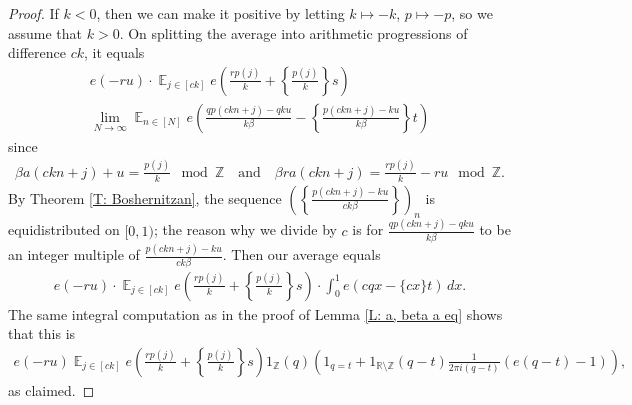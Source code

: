 \documentclass[11pt]{amsart}
\theoremstyle{definition}
\DeclareMathOperator*{\E}{\mathbb{E}}
\newcommand{\N}{{\mathbb N}}
\newcommand{\R}{{\mathbb R}}
\newcommand{\T}{{\mathbb T}}
\newcommand{\Z}{{\mathbb Z}}
\newcommand{\1}{{\mathbf{1}}}
\newcommand{\brac}[1]{\mathopen{}\left( #1 \mathclose{}\right)}
\newcommand{\rem}[1]{\left \{ #1 \right \}}
\begin{document}
\begin{proof}

{If $k<0$, then we can make it positive by letting $k\mapsto - k$, $p\mapsto - p$, so we assume that $k>0$.}
On splitting the average into arithmetic progressions of difference $ck$, it equals
\begin{multline*}
 e\brac{-ru}\cdot\E_{j\in[ck]}e\brac{\frac{r p(j)}{k}+\rem{\frac{p(j)}{k}}s} \\
 \lim_{N\to\infty}\E_{n\in[N]}e\left(\frac{qp(ckn+j)-qku}{k\beta} -\rem{\frac{p(ckn+j)-ku}{k\beta}}t\right)
\end{multline*}
since
\begin{align*}
\beta a(ckn+j) +u= \frac{p(j)}{k}\!\!\!\!\mod \Z\quad \textrm{and}\quad 
    \beta r a(ckn+j) = \frac{r p(j)}{k}-ru \!\!\!\!\mod \Z.
\end{align*}
By Theorem \ref{T: Boshernitzan}, the sequence $\brac{\rem{\frac{p(ckn+j)-ku}{ck\beta}}}_n$ is equidistributed on $[0,1)$; 
the reason why we divide by $c$ is for $\frac{qp(ckn+j)-qku}{k\beta}$ 
to be an integer multiple of $\frac{p(ckn+j)-ku}{ck\beta}$. Then our average equals
\begin{align*}
         e\brac{-ru}\cdot\E_{j\in[ck]}e\brac{\frac{r p(j)}{k}+ \rem{\frac{p(j)}{k}}s}\cdot \int_0^1 e(cq x- \{cx\}t)\, dx.
\end{align*}
The same integral computation as in the proof of Lemma \ref{L: a, beta a eq} shows that this is
\begin{align*}
    e\brac{-ru}\E_{j\in[ck]}e\brac{\frac{r p(j)}{k}+ \rem{\frac{p(j)}{k}}s} 1_\Z(q)\brac{1_{q=t} + 1_{\R\setminus\Z}(q-t)\frac{1}{2\pi i(q-t)}(e(q-t)-1)},
\end{align*}
as claimed.
\end{proof}
\end{document}
